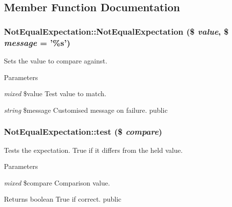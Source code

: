 \subsection{Member Function Documentation}
\hypertarget{class_not_equal_expectation_ab341bfe20b6160cba5bc3222b64214c1}{
\subsubsection[{NotEqualExpectation}]{\setlength{\rightskip}{0pt plus 5cm}NotEqualExpectation::NotEqualExpectation (\$ {\em value}, \/  \$ {\em message} = {\ttfamily '\%s'})}}
\label{class_not_equal_expectation_ab341bfe20b6160cba5bc3222b64214c1}
Sets the value to compare against. 
\begin{DoxyParams}{Parameters}
\item[{\em mixed}]\$value Test value to match. \item[{\em string}]\$message Customised message on failure.  public \end{DoxyParams}
\hypertarget{class_not_equal_expectation_a4d224959c7900fa36eadb05907129d4c}{
\subsubsection[{test}]{\setlength{\rightskip}{0pt plus 5cm}NotEqualExpectation::test (\$ {\em compare})}}
\label{class_not_equal_expectation_a4d224959c7900fa36eadb05907129d4c}
Tests the expectation. True if it differs from the held value. 
\begin{DoxyParams}{Parameters}
\item[{\em mixed}]\$compare Comparison value. \end{DoxyParams}
\begin{DoxyReturn}{Returns}
boolean True if correct.  public 
\end{DoxyReturn}


